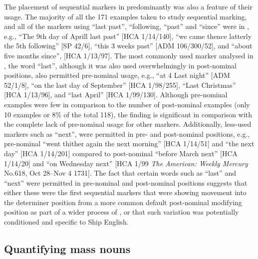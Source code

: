 The placement of sequential markers in predominantly  was also a feature of their usage. The majority of all the 171 examples taken to study sequential marking, and all of the markers using “last past”, “following, “past” and “since” were in , e.g., “The 9th day of Aprill last past” [HCA 1/14/140], “we came thence latterly the 5th following” [SP 42/6], “this 3 weeks past” [ADM 106/300/52], and “about five months since”, [HCA 1/13/97]. The most commonly used marker analysed in , the word “last”, although it was also used overwhelmingly in post-nominal positions, also permitted pre-nominal usage, e.g., “at 4 Last night” [ADM 52/1/8], “on the last day of September” [HCA 1/98/255], “Last Christmas” [HCA 1/13/96], and “last April” [HCA 1/99/130]. Although pre-nominal examples were few in comparison to the number of post-nominal examples (only 10 examples or 8\% of the total 118), the finding is significant in comparison with the complete lack of pre-nominal usage for other markers. Additionally, less-used markers such as “next”, were permitted in pre- and post-nominal positions, e.g., pre-nominal “went thither again the next morning” [HCA 1/14/51] and “the next day” [HCA 1/14/201] compared to post-nominal “before March next” [HCA 1/14/20] and “on Wednesday next” [HCA 1/99 \textit{The American: Weekly Mercury} No.618, Oct 28–Nov 4 1731]. The fact that certain words such as “last” and “next” were permitted in pre-nominal and post-nominal positions suggests that either these were the first sequential markers that were showing movement into the determiner position from a more common default post-nominal modifying position as part of a wider process of , or that such variation was potentially conditioned and specific to Ship English. 

\subsection{{Quantifying mass nouns}}\label{sec:5.3.4}

